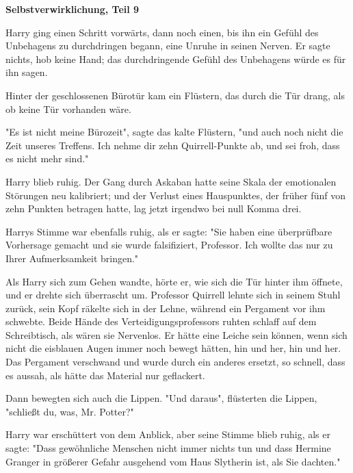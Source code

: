 

\hypertarget{selbstverwirklichung-teil-9}{%

\textbf{Selbstverwirklichung, Teil 9}

Harry ging einen Schritt vorwärts, dann noch einen, bis ihn ein Gefühl des Unbehagens zu durchdringen begann, eine Unruhe in seinen Nerven. Er sagte nichts, hob keine Hand; das durchdringende Gefühl des Unbehagens würde es für ihn sagen.

Hinter der geschlossenen Bürotür kam ein Flüstern, das durch die Tür drang, als ob keine Tür vorhanden wäre.

"Es ist nicht meine Bürozeit", sagte das kalte Flüstern, "und auch noch nicht die Zeit unseres Treffens. Ich nehme dir zehn Quirrell-Punkte ab, und sei froh, dass es nicht mehr sind."

Harry blieb ruhig. Der Gang durch Askaban hatte seine Skala der emotionalen Störungen neu kalibriert; und der Verlust eines Hauspunktes, der früher fünf von zehn Punkten betragen hatte, lag jetzt irgendwo bei null Komma drei.

Harrys Stimme war ebenfalls ruhig, als er sagte: "Sie haben eine überprüfbare Vorhersage gemacht und sie wurde falsifiziert, Professor. Ich wollte das nur zu Ihrer Aufmerksamkeit bringen."

Als Harry sich zum Gehen wandte, hörte er, wie sich die Tür hinter ihm öffnete, und er drehte sich überrascht um. Professor Quirrell lehnte sich in seinem Stuhl zurück, sein Kopf räkelte sich in der Lehne, während ein Pergament vor ihm schwebte. Beide Hände des Verteidigungsprofessors ruhten schlaff auf dem Schreibtisch, als wären sie Nervenlos. Er hätte eine Leiche sein können, wenn sich nicht die eisblauen Augen immer noch bewegt hätten, hin und her, hin und her. Das Pergament verschwand und wurde durch ein anderes ersetzt, so schnell, dass es aussah, als hätte das Material nur geflackert.

Dann bewegten sich auch die Lippen. "Und daraus", flüsterten die Lippen, "schließt du, was, Mr. Potter?"

Harry war erschüttert von dem Anblick, aber seine Stimme blieb ruhig, als er sagte: "Dass gewöhnliche Menschen nicht immer nichts tun und dass Hermine Granger in größerer Gefahr ausgehend vom Haus Slytherin ist, als Sie dachten."

}
